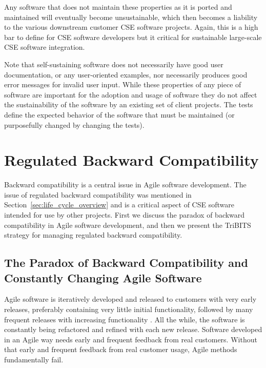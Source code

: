 \documentclass[11pt]{SANDreport}
\begin{document}
Any software that does not maintain these properties as it is ported
and maintained will eventually become unsustainable, which
then becomes a liability to the various downstream customer CSE
software projects.  Again, this is a high bar to define for CSE
software developers but it critical for
sustainable large-scale CSE software integration.

Note that self-sustaining software does not necessarily have good user
documentation, or any user-oriented examples, nor necessarily
produces good error messages for invalid user input.  While these
properties of any piece of software are important for the adoption and
usage of software they do not affect the sustainability of the software by an existing set of client projects.  The tests define the expected behavior of the software that must be maintained (or purposefully
changed by changing the tests).


%
{}\section{Regulated Backward Compatibility}
\label{sec:regulated_backard_compatibility}
%

Backward compatibility is a central issue in Agile software
development.  The issue of regulated backward compatibility was
mentioned in Section~\ref{sec:life_cycle_overview} and is a critical
aspect of CSE software intended for use by other projects.  First we discuss the paradox of
backward compatibility in Agile software development, and
then we present the  TriBITS strategy for managing regulated backward
compatibility.


%
{}\subsection{The Paradox of Backward Compatibility and Constantly
Changing Agile Software}
\label{sec:paradox_of_back_compat_agile}
%

Agile software is iteratively developed and released to customers with
very early releases, preferably containing very little initial
functionality, followed by many frequent releases with increasing
functionality {}\cite{AgileSoftwareDevelopment}.  All the while, the
software is constantly being refactored and refined with each new
release.  Software developed in an Agile way needs early and frequent
feedback from real customers.  Without that early and frequent
feedback from real customer usage, Agile methods fundamentally fail.
\end{document}
